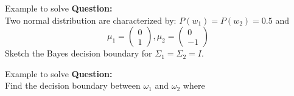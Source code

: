 \begin{frame}{Example to solve}
\textbf{\color{blue} Question:}\\
Two normal distribution are characterized by: $P(w_1)=P(w_2)=0.5$ and
\[{\mu _1} = \left( {\begin{array}{*{20}{c}}
  0 \\ 
  1 
\end{array}} \right),{\mu _2} = \left( {\begin{array}{*{20}{c}}
  0 \\ 
  { - 1} 
\end{array}} \right)\]
Sketch the Bayes decision boundary for $\Sigma_1=\Sigma_2=I$.
\end{frame}

\begin{frame}{Example to solve}
\textbf{\color{blue} Question:}\\Find the decision boundary between $\omega_1$ and $\omega_2$ where
\begin{columns}
\begin{column}{5cm}
\begin{footnotesize}
\end{footnotesize}
\end{column}
\end{columns}
\end{frame}
